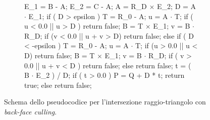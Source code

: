 \begin{figure}[htbp]
	\centering
	\begin{subfigure}{.65\linewidth}
	\begin{pseudoc}
	E_1 = B - A;
	E_2 = C - A;
	A = R_D $\times$ E_2;
	D = A $\cdot$ E_1;
	if ( D > epsilon ) {
		T = R_0 - A;
		u = A $\cdot$ T;
		if ( u < 0.0 || u > D ) return false;
		B = T $\times$ E_1;
		v = B $\cdot$ R_D;
		if (v < 0.0 || u + v > D) return false;
	} else if ( D < -epsilon ) {
		T = R_0 - A;
		u = A $\cdot$ T;
		if (u > 0.0 || u < D) return false;
		B = T $\times$ E_1;
		v = B $\cdot$ R_D;
		if ( v > 0.0 || u + v < D ) return false;
	} else {
		return false;
	}
	t = ( B $\cdot$ E_2 ) / D;
	if ( t > 0.0 ) {
		P = Q + D * t;
		return true;
	} else {
		return false;
	}
	\end{pseudoc}
	\end{subfigure}
	\caption{Schema dello pseudocodice per l'intersezione raggio-triangolo con \textit{back-face culling}.}
\end{figure}